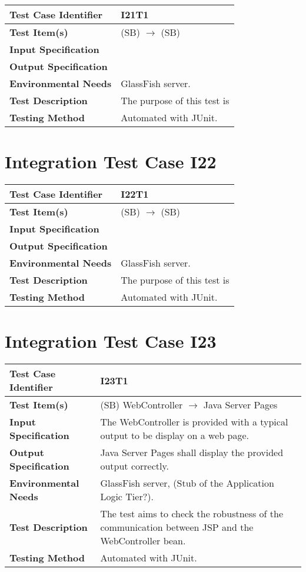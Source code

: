 \begin{longtable}{p{} | p{}}
\hline
\textbf{Test Case Identifier} & I21T1\\
\hline
\textbf{Test Item(s)} & (SB)  $\rightarrow$ (SB)  \\
\hline
\textbf{Input Specification} &  \\
\hline
\textbf{Output Specification} &  \\
\hline
\textbf{Environmental Needs} & GlassFish server. \\
\hline
\textbf{Test Description} & The purpose of this test is  \\
\hline
\textbf{Testing Method} & Automated with JUnit. \\
\hline
\end{longtable}

\section{Integration Test Case I22}

\begin{longtable}{p{} | p{}}
\hline
\textbf{Test Case Identifier} & I22T1\\
\hline
\textbf{Test Item(s)} & (SB)  $\rightarrow$ (SB)  \\
\hline
\textbf{Input Specification} &  \\
\hline
\textbf{Output Specification} &  \\
\hline
\textbf{Environmental Needs} & GlassFish server. \\
\hline
\textbf{Test Description} & The purpose of this test is  \\
\hline
\textbf{Testing Method} & Automated with JUnit. \\
\hline
\end{longtable}

\section{Integration Test Case I23}

\begin{longtable}{p{} | p{}}
\hline
\textbf{Test Case Identifier} & I23T1\\
\hline
\textbf{Test Item(s)} & (SB) WebController $\rightarrow$ Java Server Pages \\
\hline
\textbf{Input Specification} & The WebController is provided with a typical output to be display on a web page. \\
\hline
\textbf{Output Specification} & Java Server Pages shall display the provided output correctly. \\
\hline
\textbf{Environmental Needs} & GlassFish server, (Stub of the Application Logic Tier?). \\
\hline
\textbf{Test Description} & The test aims to check the robustness of the communication between JSP and the WebController bean. \\
\hline
\textbf{Testing Method} & Automated with JUnit. \\
\hline
\end{longtable}

